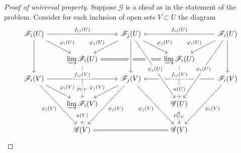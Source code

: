 \documentclass[12pt,letterpaper]{article}
\theoremstyle{definition}
\theoremstyle{remark}
\numberwithin{equation}{section}
\numberwithin{figure}{problem}
\begin{document}
\begin{proof}[Proof of universal property]
  Suppose $\mathscr{G}$ is a sheaf as in the statement of the problem. Consider for each inclusion of open sets $V \subset U$ the diagram
  \begin{equation*}
    \begin{tikzcd}[row sep=small]
      \mathscr{F}_i(U) \arrow{rr}{f_{ij}(U)}\arrow{ddr}{\varphi_i(U)}\arrow{ddd} & & \mathscr{F}_j(U)\arrow{ddl}[swap]{\varphi_j(U)}\arrow{ddr}{\varphi_j(U)} & & \mathscr{F}_i(U)\arrow{ll}[swap]{f_{ij}(U)}\arrow{ddl}[swap]{\varphi_i(U)}\arrow{ddd}\\
      \\
      & \varinjlim \mathscr{F}_i(U)\arrow[dashed]{ddd}[description,yshift=-10pt]{\rho_{UV}}\arrow[equal]{rr} & & \varinjlim \mathscr{F}_i(U)\arrow[dashed]{ddd}[description,yshift=-10pt]{u(U)}\\
      \mathscr{F}_i(V)\arrow{ddr}{\varphi_i(V)}\arrow{ddddr}[swap]{\psi_i(V)}\arrow{rr}[fill=white]{f_{ij}(V)} & & \mathscr{F}_j(V)\arrow{ddl}[swap]{\varphi_j(V)}\arrow{ddddl}{\psi_j(V)}\arrow[leftarrow,crossing over]{uuu}& & \mathscr{F}_i(V) \arrow{ll}[swap,fill=white]{f_{ij}(V)}\\
      \\
      & \varinjlim \mathscr{F}_i(V)\arrow[dashed]{dd}[description,yshift=3pt]{u(V)} & & \mathscr{G}(U)\arrow{dd}[description,yshift=3pt]{\rho^{\mathscr{G}}_{UV}}\arrow[leftarrow,crossing over]{uuuuul}[description]{\psi_j(U)}\arrow[leftarrow, crossing over]{uuuuur}[description]{\psi_i(U)}\\
      \\
      & \mathscr{G}(V) \arrow[equal]{rr} & & \mathscr{G}(V) \arrow[leftarrow]{uuuul}{\psi_j(V)}\arrow[leftarrow]{uuuur}[swap]{\psi_i(V)}
    \end{tikzcd}
  \end{equation*}

\end{proof}
\end{document}
